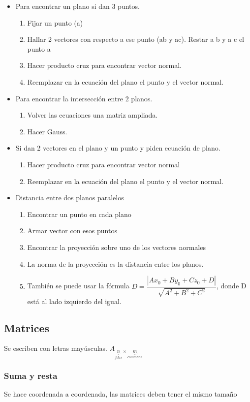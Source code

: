 \begin{itemize}
	\item Para encontrar un plano si dan 3 puntos.
	\begin{enumerate}
		\item Fijar un punto (a)
		\item Hallar 2 vectores con respecto a ese punto (ab y ac). Restar a b y a c el punto a
		\item Hacer producto cruz para encontrar vector normal.
		\item Reemplazar en la ecuación del plano el punto y el vector normal.
	\end{enumerate}
	\item Para encontrar la intersección entre 2 planos.
	\begin{enumerate}
		\item Volver las ecuaciones una matriz ampliada.
		\item Hacer Gauss.
	\end{enumerate}
	\item Si dan 2 vectores en el plano y un punto y piden ecuación de plano.
	\begin{enumerate}
		\item Hacer producto cruz para encontrar vector normal
		\item Reemplazar en la ecuación del plano el punto y el vector normal.
	\end{enumerate}
	\item Distancia entre dos planos paralelos
	\begin{enumerate}
		\item Encontrar un punto en cada plano
		\item Armar vector con esos puntos
		\item Encontrar la proyección sobre uno de los vectores normales
		\item La norma de la proyección es la distancia entre los planos.
		\item También se puede usar la fórmula $D=\dfrac{|Ax_0+By_0+Cz_0+D|}{\sqrt{A^2+B^2+C^2}}$, donde D está al lado izquierdo del igual.
	\end{enumerate}
\end{itemize}

\subsection{Matrices}
Se escriben con letras mayúsculas. $A_{\underbrace{n}_{{filas}}\times \underbrace{m}_{columnas}}
$
\subsubsection{Suma y resta}
Se hace coordenada a coordenada, las matrices deben tener el mismo tamaño
